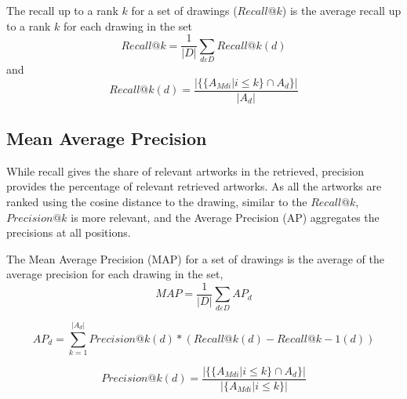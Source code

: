 The recall up to a rank \begin{math} k \end{math} for a set of drawings (\begin{math} {Recall@k} \end{math}) is the average recall up to a rank \begin{math} k \end{math} for each drawing in the set 
\begin{displaymath}
{Recall@k} = \frac{1}{\left | D \right |}\sum_{d\varepsilon D}Recall@k(d)
\end{displaymath}
and 
\begin{displaymath}
Recall@k(d) = \frac{ \left | \{ \{ A_{Mdi} | i \leq k \} \cap {A}_{d} \} \right |} { \left | {A}_{d} \right |}
\end{displaymath}

\subsection{Mean Average Precision}

While recall gives the share of relevant artworks in the retrieved, precision provides the percentage of relevant retrieved artworks. As all the artworks are ranked using the cosine distance to the drawing, similar to the \begin{math} Recall@k \end{math}, \begin{math} Precision@k \end{math} is more relevant, and the Average Precision (AP) aggregates the precisions at all positions. 

The Mean Average Precision (MAP) for a set of drawings is the average of the average precision for each drawing in the set,
\begin{displaymath}
MAP = \frac{1}{\left | D \right |}\sum_{d\varepsilon D} {AP}_{d}
\end{displaymath}

\begin{displaymath}
{AP}_{d} = \sum_{k=1}^{\left | {A}_{d} \right |} Precision@k(d) * (Recall@k(d) - Recall@k-1(d))
\end{displaymath}

\begin{displaymath}
Precision@k(d) = \frac{ \left | \{ \{ A_{Mdi} | i \leq k \} \cap {A}_{d} \} \right |} { \left | \{ A_{Mdi} | i \leq k \} \right |}
\end{displaymath}